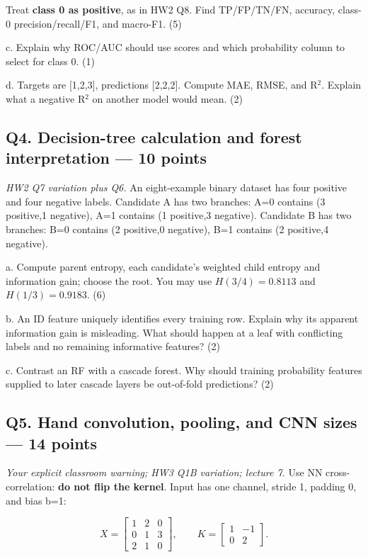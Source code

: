 \documentclass[11pt]{article}
\begin{document}
Treat \textbf{class 0 as positive}, as in HW2 Q8. Find TP/\allowbreak{}FP/\allowbreak{}TN/\allowbreak{}FN, accuracy, class-0 precision/\allowbreak{}recall/\allowbreak{}F1, and macro-F1. (5)

c. Explain why ROC/\allowbreak{}AUC should use scores and which probability column to select for class 0. (1)

d. Targets are [1,2,3], predictions [2,2,2]. Compute MAE, RMSE, and R\ensuremath{{}^2}. Explain what a negative R\ensuremath{{}^2} on another model would mean. (2)

\subsection*{Q4. Decision-tree calculation and forest interpretation — 10 points}

\emph{HW2 Q7 variation plus Q6.} An eight-example binary dataset has four positive and four negative labels. Candidate A has two branches: A=0 contains (3 positive,1 negative), A=1 contains (1 positive,3 negative). Candidate B has two branches: B=0 contains (2 positive,0 negative), B=1 contains (2 positive,4 negative).

a. Compute parent entropy, each candidate's weighted child entropy and information gain; choose the root. You may use $H(3/4)=0.8113$ and $H(1/3)=0.9183$. (6)

b. An ID feature uniquely identifies every training row. Explain why its apparent information gain is misleading. What should happen at a leaf with conflicting labels and no remaining informative features? (2)

c. Contrast an RF with a cascade forest. Why should training probability features supplied to later cascade layers be out-of-fold predictions? (2)

\subsection*{Q5. Hand convolution, pooling, and CNN sizes — 14 points}

\emph{Your explicit classroom warning; HW3 Q1B variation; lecture 7.} Use NN cross-correlation: \textbf{do not flip the kernel}. Input has one channel, stride 1, padding 0, and bias b=1:

\[
X=\begin{bmatrix}1&2&0\\0&1&3\\2&1&0\end{bmatrix},\qquad K=\begin{bmatrix}1&-1\\0&2\end{bmatrix}.
\]
\end{document}
